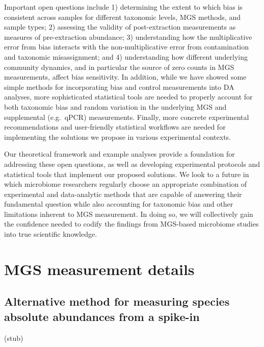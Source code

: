 \documentclass[
]{article}
\begin{document}
Important open questions include 1) determining the extent to which bias is consistent across samples for different taxonomic levels, MGS methods, and sample types; 2) assessing the validity of post-extraction measurements as measures of pre-extraction abundance; 3) understanding how the multiplicative error from bias interacts with the non-multiplicative error from contamination and taxonomic misassignment; and 4) understanding how different underlying community dynamics, and in particular the source of zero counts in MGS measurements, affect bias sensitivity.
In addition, while we have showed some simple methods for incorporating bias and control measurements into DA analyses, more sophisticated statistical tools are needed to properly account for both taxonomic bias and random variation in the underlying MGS and supplemental (e.g.~qPCR) measurements.
Finally, more concrete experimental recommendations and user-friendly statistical workflows are needed for implementing the solutions we propose in various experimental contexts.

Our theoretical framework and example analyses provide a foundation for addressing these open questions, as well as developing experimental protocols and statistical tools that implement our proposed solutions.
We look to a future in which microbiome researchers regularly choose an appropriate combination of experimental and data-analytic methods that are capable of answering their fundamental question while also accounting for taxonomic bias and other limitations inherent to MGS measurement.
In doing so, we will collectively gain the confidence needed to codify the findings from MGS-based microbiome studies into true scientific knowledge.

\hypertarget{appendix-appendix}{%
\appendix {}}


\hypertarget{mgs-measurement-details}{%
\section{MGS measurement details}\label{mgs-measurement-details}}

\hypertarget{spike-in-alt}{%
\subsection{Alternative method for measuring species absolute abundances from a spike-in}\label{spike-in-alt}}

(stub)
\end{document}
